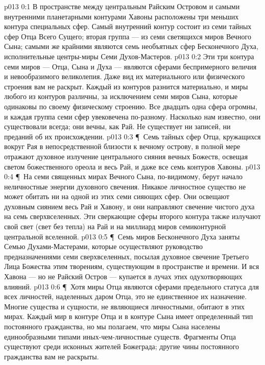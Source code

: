 \vs p013 0:1 В пространстве между центральным Райским Островом и самыми внутренними планетарными контурами Хавоны расположены три меньших контура специальных сфер. Самый внутренний контур состоит из семи тайных сфер Отца Всего Сущего; вторая группа --- из семи светящихся миров Вечного Сына; самыми же крайними являются семь необъятных сфер Бесконечного Духа, исполнительные центры\hyp{}миры Семи Духов\hyp{}Мастеров.
\vs p013 0:2 Эти три контура семи миров --- Отца, Сына и Духа --- являются сферами беспримерного величия и невообразимого великолепия. Даже вид их материального или физического строения вам не раскрыт. Каждый из контуров разнится материально, и миры любого из контуров различны, за исключением семи миров Сына, которые одинаковы по своему физическому строению. Все двадцать одна сфера огромны, и каждая группа семи сфер увековечена по\hyp{}разному. Насколько нам известно, они существовали всегда; они вечны, как Рай. Не существует ни записей, ни преданий об их происхождении.
\vs p013 0:3 \P\ Семь тайных сфер Отца, кружащихся вокруг Рая в непосредственной близости к вечному острову, в полной мере отражают духовное излучение центрального сияния вечных Божеств, освещая светом божественного ореола и весь Рай, и даже все семь контуров Хавоны.
\vs p013 0:4 \P\ На семи священных мирах Вечного Сына, по\hyp{}видимому, берут начало неличностные энергии духовного свечения. Никакое личностное существо не может обитать ни на одной из этих семи сияющих сфер. Они освещают духовным сиянием весь Рай и Хавону, и они направляют свечение чистого духа на семь сверхвселенных. Эти сверкающие сферы второго контура также излучают свой свет (свет без тепла) на Рай и на миллиард миров семиконтурной центральной вселенной.
\vs p013 0:5 \P\ Семь миров Бесконечного Духа заняты Семью Духами\hyp{}Мастерами, которые осуществляют руководство предназначениями семи сверхвселенных, посылая духовное свечение Третьего Лица Божества этим творениям, существующим в пространстве и времени. И вся Хавона --- но не Райский Остров --- купается в лучах этих одухотворяющих влияний.
\vs p013 0:6 \P\ Хотя миры Отца являются сферами предельного статуса для всех личностей, наделенных даром Отца, это не единственное их назначение. Многие существа и сущности, не являющиеся личностными, обитают в этих мирах. Каждый мир в контуре Отца и в контуре Сына имеет определенный тип постоянного гражданства, но мы полагаем, что миры Сына населены единообразными типами иных\hyp{}чем\hyp{}личностные существ. Фрагменты Отца существуют среди исконных жителей Божеграда; другие чины постоянного гражданства вам не раскрыты.
